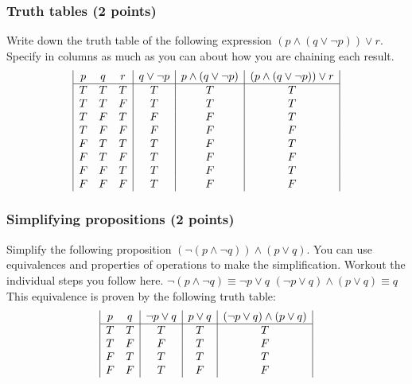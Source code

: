 \documentclass[]{book}
\theoremstyle{definition}
\begin{document}
\subsubsection*{Truth tables (2 points)}
Write down the truth table of the following expression $(p \land (q \lor \neg p) ) \lor r$. Specify in columns as much as you can about how you are chaining each result. \newline
\begin{displaymath}
	\begin{array}{|c c c|c|c|c|}
		p & q & r & q \lor \lnot p & p \land (q \lor \lnot p) & (p \land (q \lor \lnot p)) \lor r\\
		\hline
		T & T & T & T & T & T\\
		T & T & F & T & T & T\\
		T & F & T & F & F & T\\
		T & F & F & F & F & F\\
		F & T & T & T & F & T\\
		F & T & F & T & F & F\\
		F & F & T & T & F & T\\
		F & F & F & T & F & F\\
	\end{array}
\end{displaymath}

\subsubsection*{Simplifying propositions (2 points)}
Simplify the following proposition $(\neg (p \land \neg q)) \land (p \lor q)$. 
You can use equivalences and properties of operations to make the simplification.
Workout the individual steps you follow here. \newline
$\lnot(p \land \lnot q) \equiv \lnot p \lor q$ \newline
$(\lnot p \lor q) \land (p \lor q) \equiv q$ \newline
This equivalence is proven by the following truth table: 
\begin{displaymath}
	\begin{array}{|c c|c|c|c|}
		p & q & \lnot p \lor q & p \lor q & (\lnot p \lor q) \land (p \lor q)\\
		\hline
		T & T & T & T & T\\
		T & F & F & T & F\\
		F & T & T & T & T\\
		F & F & T & F & F\\
	\end{array}
\end{displaymath}
\end{document}
